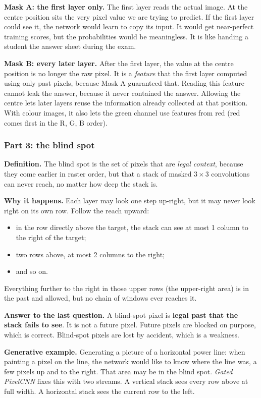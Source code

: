 \documentclass[12pt,a4paper]{article}
\begin{document}
\textbf{Mask A: the first layer only.} The first layer reads the actual image. At the centre position sits the very pixel value we are trying to predict. If the first layer could see it, the network would learn to copy its input. It would get near-perfect training scores, but the probabilities would be meaningless. It is like handing a student the answer sheet during the exam.

\textbf{Mask B: every later layer.} After the first layer, the value at the centre position is no longer the raw pixel. It is a \emph{feature} that the first layer computed using only past pixels, because Mask A guaranteed that. Reading this feature cannot leak the answer, because it never contained the answer. Allowing the centre lets later layers reuse the information already collected at that position. With colour images, it also lets the green channel use features from red (red comes first in the R, G, B order).

\subsubsection{Part 3: the blind spot}

\textbf{Definition.} The blind spot is the set of pixels that are \emph{legal context}, because they come earlier in raster order, but that a stack of masked $3 \times 3$ convolutions can never reach, no matter how deep the stack is.

\textbf{Why it happens.} Each layer may look one step up-right, but it may never look right on its own row. Follow the reach upward:
\begin{itemize}[leftmargin=*]
\item in the row directly above the target, the stack can see at most 1 column to the right of the target;
\item two rows above, at most 2 columns to the right;
\item and so on.
\end{itemize}
Everything further to the right in those upper rows (the upper-right area) is in the past and allowed, but no chain of windows ever reaches it.

\textbf{Answer to the last question.} A blind-spot pixel is \textbf{legal past that the stack fails to see}. It is not a future pixel. Future pixels are blocked on purpose, which is correct. Blind-spot pixels are lost by accident, which is a weakness.

\textbf{Generative example.} Generating a picture of a horizontal power line: when painting a pixel on the line, the network would like to know where the line was, a few pixels up and to the right. That area may be in the blind spot. \emph{Gated PixelCNN} fixes this with two streams. A vertical stack sees every row above at full width. A horizontal stack sees the current row to the left.
\end{document}
